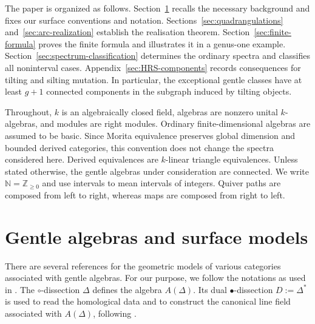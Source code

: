 \documentclass[11pt]{amsart}
\theoremstyle{definition}
\theoremstyle{plain}
\theoremstyle{definition}
\theoremstyle{definition}
\newcommand{\ZZ}{\mathbb Z}
\newcommand{\NN}{\mathbb N}
\begin{document}


The paper is organized as follows.
Section~\ref{sec:surface-data} recalls the necessary
background and fixes our surface conventions and notation.
Sections~\ref{sec:quadrangulations} and~\ref{sec:arc-realization}
establish the realisation theorem.
Section~\ref{sec:finite-formula} proves the finite formula
and illustrates it in a genus-one example.
Section~\ref{sec:spectrum-classification} determines the
ordinary spectra and classifies all noninterval cases.
Appendix~\ref{sec:HRS-components} records consequences
for tilting and silting mutation. In particular, the
exceptional gentle classes have at least $g+1$ connected
components in the subgraph induced by tilting objects.

Throughout, $k$ is an algebraically closed field, algebras
are nonzero unital $k$-algebras, and modules are right modules.
Ordinary finite-dimensional algebras are assumed to be basic.
Since Morita equivalence preserves global dimension and
bounded derived categories, this convention does not change
the spectra considered here. Derived equivalences are
$k$-linear triangle equivalences. Unless stated otherwise,
the gentle algebras under consideration are connected.
We write $\NN=\ZZ_{\geq0}$ and use intervals to mean intervals
of integers. Quiver paths are composed from left to right,
whereas maps are composed from right to left.

\section{Gentle algebras and surface models}
\label{sec:surface-data}
There are several references for the geometric models of various categories associated with gentle algebras.
For our purpose, we follow the notations as used in \cite{ChangJinSchroll}. The $\circ$-dissection $\Delta$ defines the algebra $A(\Delta)$.
Its dual $\bullet$-dissection $D:=\Delta^*$ is used to read the
homological data and to construct the canonical line field
associated with $A(\Delta)$, following \cite{AmiotPlamondonSchroll}.
\end{document}
